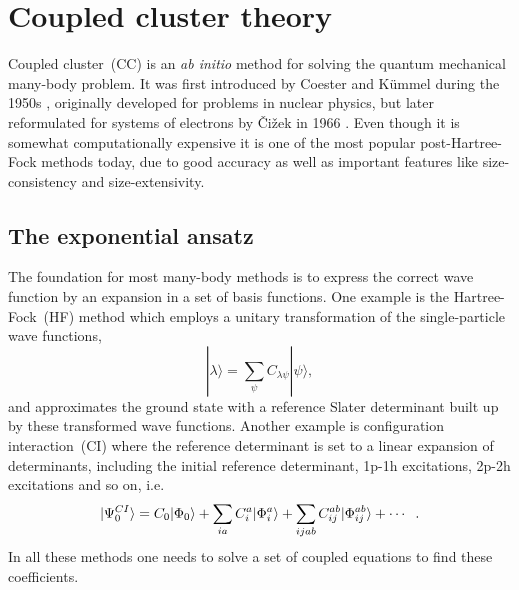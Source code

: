 \chapter{Coupled cluster theory}
Coupled cluster~(CC) is an \textit{ab initio} method for solving the quantum mechanical many-body problem.
It was first introduced by Coester and Kümmel during the 1950s \cite{NucPhys.7.421,NucPhys.17.477},
originally developed for problems in nuclear physics, but later reformulated for systems of electrons by \v{C}i\v{z}ek in 1966 \cite{ChemPhys.45.4256}.
Even though it is somewhat computationally expensive it is one of the most popular post-Hartree-Fock methods today, due to good accuracy as well as important features like size-consistency and size-extensivity.

\section{The exponential ansatz}
The foundation for most many-body methods is to express the correct wave function by an expansion in a set of basis functions. 
One example is the Hartree-Fock~(HF) method which employs a unitary transformation of the single-particle wave functions, 
\begin{equation}
|\lambda \rangle = \sum_{\psi} C_{\lambda \psi} |\psi \rangle ,
\end{equation}
and approximates the ground state with a reference Slater determinant built up by these transformed wave functions.
Another example is configuration interaction~(CI) where the reference determinant is set to a linear expansion of determinants, including the initial reference determinant, 1p-1h excitations, 2p-2h excitations and so on, i.e.
\begin{equation}
|\Psi_{0}^{CI} \rangle = C_0 |\Phi_0 \rangle + \sum_{ia} C_i^a |\Phi_i^a\rangle + \sum_{ijab} C_{ij}^{ab} |\Phi_{ij}^{ab} \rangle + \cdots \hspace{2mm}.
\end{equation}
In all these methods one needs to solve a set of coupled equations to find these coefficients.

